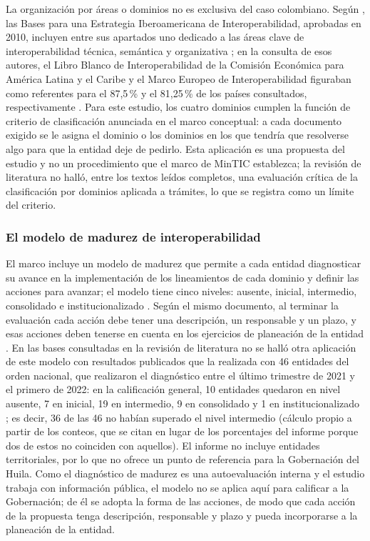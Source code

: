 La organización por áreas o dominios no es exclusiva del caso colombiano. Según \textcite{criado2011interoperabilidad}, las Bases para una Estrategia Iberoamericana de Interoperabilidad, aprobadas en 2010, incluyen entre sus apartados uno dedicado a las áreas clave de interoperabilidad técnica, semántica y organizativa ; en la consulta de esos autores, el Libro Blanco de Interoperabilidad de la Comisión Económica para América Latina y el Caribe y el Marco Europeo de Interoperabilidad figuraban como referentes para el 87,5\,\% y el 81,25\,\% de los países consultados, respectivamente . Para este estudio, los cuatro dominios cumplen la función de criterio de clasificación anunciada en el marco conceptual: a cada documento exigido se le asigna el dominio o los dominios en los que tendría que resolverse algo para que la entidad deje de pedirlo. Esta aplicación es una propuesta del estudio y no un procedimiento que el marco de MinTIC establezca; la revisión de literatura no halló, entre los textos leídos completos, una evaluación crítica de la clasificación por dominios aplicada a trámites, lo que se registra como un límite del criterio.

\subsubsection{El modelo de madurez de interoperabilidad}

El marco incluye un modelo de madurez que permite a cada entidad diagnosticar su avance en la implementación de los lineamientos de cada dominio y definir las acciones para avanzar; el modelo tiene cinco niveles: ausente, inicial, intermedio, consolidado e institucionalizado \parencite[p.~75]{mintic2019marco}. Según el mismo documento, al terminar la evaluación cada acción debe tener una descripción, un responsable y un plazo, y esas acciones deben tenerse en cuenta en los ejercicios de planeación de la entidad \parencite[p.~75]{mintic2019marco}. En las bases consultadas en la revisión de literatura no se halló otra aplicación de este modelo con resultados publicados que la realizada con 46 entidades del orden nacional, que realizaron el diagnóstico entre el último trimestre de 2021 y el primero de 2022: en la calificación general, 10 entidades quedaron en nivel ausente, 7 en inicial, 19 en intermedio, 9 en consolidado y 1 en institucionalizado \parencite[pp.~6, 8]{mintic2022informe}; es decir, 36 de las 46 no habían superado el nivel intermedio (cálculo propio a partir de los conteos, que se citan en lugar de los porcentajes del informe porque dos de estos no coinciden con aquellos). El informe no incluye entidades territoriales, por lo que no ofrece un punto de referencia para la Gobernación del Huila. Como el diagnóstico de madurez es una autoevaluación interna y el estudio trabaja con información pública, el modelo no se aplica aquí para calificar a la Gobernación; de él se adopta la forma de las acciones, de modo que cada acción de la propuesta tenga descripción, responsable y plazo y pueda incorporarse a la planeación de la entidad.

